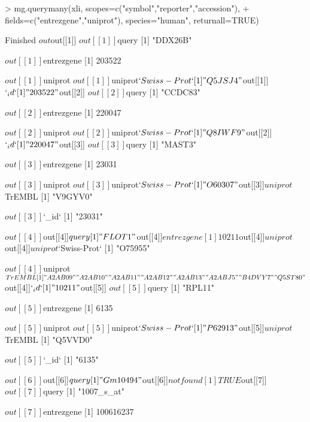\documentclass[12pt]{article}
\begin{document}
\begin{Schunk}
\begin{Sinput}
> mg.querymany(xli, scopes=c("symbol","reporter","accession"), 
+              fields=c("entrezgene","uniprot"), species="human", returnall=TRUE)
\end{Sinput}
\begin{Soutput}
Finished
$out
$out[[1]]
$out[[1]]$query
[1] "DDX26B"

$out[[1]]$entrezgene
[1] 203522

$out[[1]]$uniprot
$out[[1]]$uniprot$`Swiss-Prot`
[1] "Q5JSJ4"


$out[[1]]$`_id`
[1] "203522"


$out[[2]]
$out[[2]]$query
[1] "CCDC83"

$out[[2]]$entrezgene
[1] 220047

$out[[2]]$uniprot
$out[[2]]$uniprot$`Swiss-Prot`
[1] "Q8IWF9"


$out[[2]]$`_id`
[1] "220047"


$out[[3]]
$out[[3]]$query
[1] "MAST3"

$out[[3]]$entrezgene
[1] 23031

$out[[3]]$uniprot
$out[[3]]$uniprot$`Swiss-Prot`
[1] "O60307"

$out[[3]]$uniprot$TrEMBL
[1] "V9GYV0"


$out[[3]]$`_id`
[1] "23031"


$out[[4]]
$out[[4]]$query
[1] "FLOT1"

$out[[4]]$entrezgene
[1] 10211

$out[[4]]$uniprot
$out[[4]]$uniprot$`Swiss-Prot`
[1] "O75955"

$out[[4]]$uniprot$TrEMBL
[1] "A2AB09" "A2AB10" "A2AB11" "A2AB12" "A2AB13" "A2ABJ5" "B4DVY7" "Q5ST80"


$out[[4]]$`_id`
[1] "10211"


$out[[5]]
$out[[5]]$query
[1] "RPL11"

$out[[5]]$entrezgene
[1] 6135

$out[[5]]$uniprot
$out[[5]]$uniprot$`Swiss-Prot`
[1] "P62913"

$out[[5]]$uniprot$TrEMBL
[1] "Q5VVD0"


$out[[5]]$`_id`
[1] "6135"


$out[[6]]
$out[[6]]$query
[1] "Gm10494"

$out[[6]]$notfound
[1] TRUE


$out[[7]]
$out[[7]]$query
[1] "1007_s_at"

$out[[7]]$entrezgene
[1] 100616237


\end{Soutput}
\end{Schunk}
\end{document}
